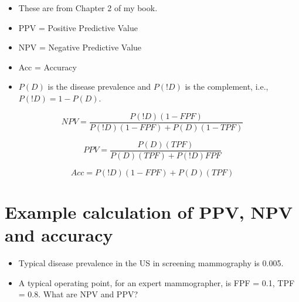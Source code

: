 \documentclass[
]{book}
\providecommand{\tightlist}{%
  \setlength{\itemsep}{0pt}\setlength{\parskip}{0pt}}
\begin{document}
\begin{itemize}
\tightlist
\item
  These are from Chapter 2 of my book.
\item
  PPV = Positive Predictive Value
\item
  NPV = Negative Predictive Value
\item
  Acc = Accuracy
\item
  \(P(D)\) is the disease prevalence and \(P(!D)\) is the complement, i.e., \(P(!D) = 1 - P(D)\).
\end{itemize}

\begin{equation*} 
NPV =\frac{P(!D)(1-FPF)}{P(!D)(1-FPF)+P(D)(1-TPF)}
\end{equation*}

\begin{equation*} 
PPV =\frac{P(D)(TPF)}{P(D)(TPF)+P(!D)FPF}
\end{equation*}

\begin{equation*} 
Acc =P(!D)(1-FPF)+P(D)(TPF)
\end{equation*}

\hypertarget{example-calculation-of-ppv-npv-and-accuracy}{%
\section{Example calculation of PPV, NPV and accuracy}\label{example-calculation-of-ppv-npv-and-accuracy}}

\begin{itemize}
\tightlist
\item
  Typical disease prevalence in the US in screening mammography is 0.005.
\item
  A typical operating point, for an expert mammographer, is FPF = 0.1, TPF = 0.8. What are NPV and PPV?
\end{itemize}
\end{document}
